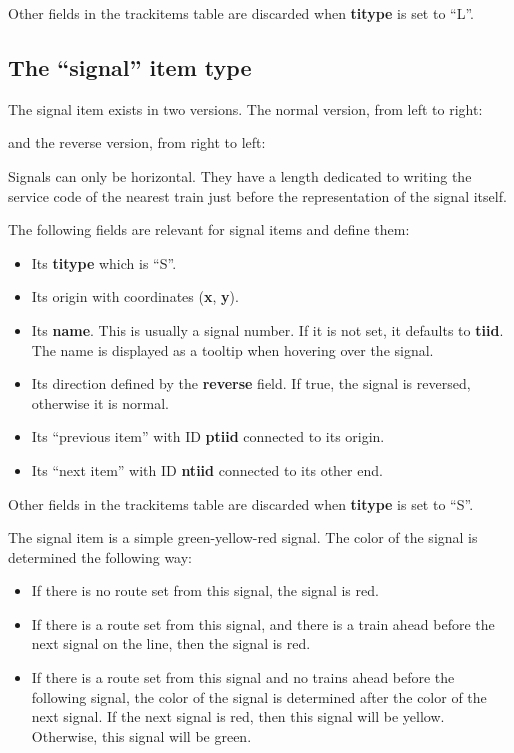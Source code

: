 \documentclass[12pt,a4paper]{article}
\begin{document}
Other fields in the trackitems table are discarded when \textbf{titype} is set to ``L''.

\subsection{The ``signal'' item type}
The signal item exists in two versions. The normal version, from left to right:

\begin{center}
\end{center}

and the reverse version, from right to left:

\begin{center}
\end{center}

Signals can only be horizontal. They have a length dedicated to writing the service code of the nearest train just before the representation of the signal itself. 

The following fields are relevant for signal items and define them:
\begin{itemize}
 \item Its \textbf{titype} which is ``S''.
 \item Its origin with coordinates (\textbf{x}, \textbf{y}).
 \item Its \textbf{name}. This is usually a signal number. If it is not set, it defaults to \textbf{tiid}. The name is displayed as a tooltip when hovering over the signal.
 \item Its direction defined by the \textbf{reverse} field. If true, the signal is reversed, otherwise it is normal.
 \item Its ``previous item'' with ID \textbf{ptiid} connected to its origin.
 \item Its ``next item'' with ID \textbf{ntiid} connected to its other end. 
\end{itemize}

Other fields in the trackitems table are discarded when \textbf{titype} is set to ``S''.

The signal item is a simple green-yellow-red signal. The color of the signal is determined the following way:
\begin{itemize}
 \item If there is no route set from this signal, the signal is red.
 \item If there is a route set from this signal, and there is a train ahead before the next signal on the line, then the signal is red.
 \item If there is a route set from this signal and no trains ahead before the following signal, the color of the signal is determined after the color of the next signal. If the next signal is red, then this signal will be yellow. Otherwise, this signal will be green.
\end{itemize}
\end{document}
